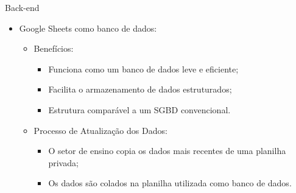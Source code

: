 \begin{frame}{Back-end}
    \begin{itemize}
        \item Google Sheets como banco de dados: \vspace{0.5cm}
              \begin{itemize}
                  \item Benefícios: \vspace{0.25cm}
                        \begin{itemize}
                            \item Funciona como um banco de dados leve e eficiente; \vspace{0.25cm}
                            \item Facilita o armazenamento de dados estruturados; \vspace{0.25cm}
                            \item Estrutura comparável a um SGBD convencional. \vspace{0.25cm}
                        \end{itemize}
                  \item Processo de Atualização dos Dados: \vspace{0.25cm}
                        \begin{itemize}
                            \item O setor de ensino copia os dados mais recentes de uma planilha privada; \vspace{0.25cm}
                            \item Os dados são colados na planilha utilizada como banco de dados. \vspace{0.25cm}
                        \end{itemize}
              \end{itemize}
    \end{itemize}
\end{frame}

